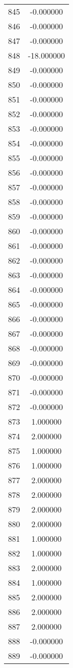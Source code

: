 \documentclass[12pt]{article}
\begin{document}
\begin{longtable}{@{}cc@{}}
845 & -0.000000 \\
846 & -0.000000 \\
847 & -0.000000 \\
848 & -18.000000 \\
849 & -0.000000 \\
850 & -0.000000 \\
851 & -0.000000 \\
852 & -0.000000 \\
853 & -0.000000 \\
854 & -0.000000 \\
855 & -0.000000 \\
856 & -0.000000 \\
857 & -0.000000 \\
858 & -0.000000 \\
859 & -0.000000 \\
860 & -0.000000 \\
861 & -0.000000 \\
862 & -0.000000 \\
863 & -0.000000 \\
864 & -0.000000 \\
865 & -0.000000 \\
866 & -0.000000 \\
867 & -0.000000 \\
868 & -0.000000 \\
869 & -0.000000 \\
870 & -0.000000 \\
871 & -0.000000 \\
872 & -0.000000 \\
873 & 1.000000 \\
874 & 2.000000 \\
875 & 1.000000 \\
876 & 1.000000 \\
877 & 2.000000 \\
878 & 2.000000 \\
879 & 2.000000 \\
880 & 2.000000 \\
881 & 1.000000 \\
882 & 1.000000 \\
883 & 2.000000 \\
884 & 1.000000 \\
885 & 2.000000 \\
886 & 2.000000 \\
887 & 2.000000 \\
888 & -0.000000 \\
889 & -0.000000 \\

\end{longtable}
\end{document}
